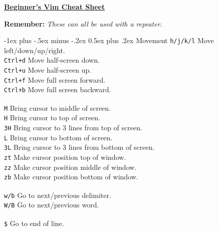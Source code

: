 \documentclass[10pt,landscape]{article}
\makeatletter
\renewcommand{\section}{\@startsection{section}{1}{0mm}%
                                {-1ex plus -.5ex minus -.2ex}%
                                {0.5ex plus .2ex}%
                                {\normalfont\large\bfseries}}
\makeatother
\begin{document}
\raggedright
\begin{multicols}{3}

\setlength{\columnseprule}{0.25pt}
\setlength{\premulticols}{1pt}
\setlength{\postmulticols}{1pt}
\setlength{\multicolsep}{1pt}
\setlength{\columnsep}{2pt}

\begin{center}
     \Large{\underline{\textbf{Beginner's Vim Cheat Sheet}}} \\
\end{center}

\textbf{Remember: }\textit{These can all be used with a repeater.}

\section{Movement}
\verb!h/j/k/l! \hfill Move left/down/up/right.\\
\verb!Ctrl+d! \hfill Move half-screen down.\\
\verb!Ctrl+u! \hfill Move half-screen up.\\
\verb!Ctrl+f! \hfill Move full screen forward.\\
\verb!Ctrl+b! \hfill Move full screen backward.\\
\verb! !\\
\verb!M! \hfill Bring cursor to middle of screen.\\
\verb!H! \hfill Bring cursor to top of screen.\\
\verb!3H! \hfill Bring cursor to 3 lines from top of screen.\\
\verb!L! \hfill Bring cursor to bottom of screen.\\
\verb!3L! \hfill Bring cursor to 3 lines from bottom of screen.\\
\verb!zt! \hfill Make cursor position top of window.\\
\verb!zz! \hfill Make cursor position middle of window.\\
\verb!zb! \hfill Make cursor position bottom of window.\\
\verb! !\\
\verb!w/b! \hfill Go to next/previous delimiter.\\
\verb!W/B! \hfill Go to next/previous word.\\
\verb! !\\
\verb!$! \hfill Go to end of line.\\

\end{multicols}
\end{document}
